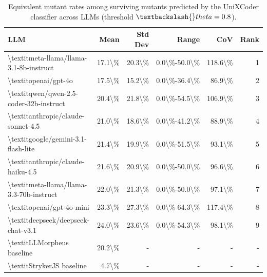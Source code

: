 \begin{table}[htbp]
\centering
{\small
\begin{tabular}{l|rrrrr}
\toprule
\textbf{LLM} & \textbf{Mean} & \textbf{Std Dev} & \textbf{Range} & \textbf{CoV} & \textbf{Rank} \\
\midrule
\textbackslash{}textit{meta-llama/llama-3.1-8b-instruct} & 17.1\textbackslash{}\% & 20.3\textbackslash{}\% & 0.0\textbackslash{}\%-50.0\textbackslash{}\% & 118.6\textbackslash{}\% & 1 \\
\textbackslash{}textit{openai/gpt-4o} & 17.5\textbackslash{}\% & 15.2\textbackslash{}\% & 0.0\textbackslash{}\%-36.4\textbackslash{}\% & 86.9\textbackslash{}\% & 2 \\
\textbackslash{}textit{qwen/qwen-2.5-coder-32b-instruct} & 20.4\textbackslash{}\% & 21.8\textbackslash{}\% & 0.0\textbackslash{}\%-54.5\textbackslash{}\% & 106.9\textbackslash{}\% & 3 \\
\textbackslash{}textit{anthropic/claude-sonnet-4.5} & 21.0\textbackslash{}\% & 18.6\textbackslash{}\% & 0.0\textbackslash{}\%-41.2\textbackslash{}\% & 88.9\textbackslash{}\% & 4 \\
\textbackslash{}textit{google/gemini-3.1-flash-lite} & 21.4\textbackslash{}\% & 19.9\textbackslash{}\% & 0.0\textbackslash{}\%-51.5\textbackslash{}\% & 93.1\textbackslash{}\% & 5 \\
\textbackslash{}textit{anthropic/claude-haiku-4.5} & 21.6\textbackslash{}\% & 20.9\textbackslash{}\% & 0.0\textbackslash{}\%-50.0\textbackslash{}\% & 96.6\textbackslash{}\% & 6 \\
\textbackslash{}textit{meta-llama/llama-3.3-70b-instruct} & 22.0\textbackslash{}\% & 21.3\textbackslash{}\% & 0.0\textbackslash{}\%-50.0\textbackslash{}\% & 97.1\textbackslash{}\% & 7 \\
\textbackslash{}textit{openai/gpt-4o-mini} & 23.3\textbackslash{}\% & 27.3\textbackslash{}\% & 0.0\textbackslash{}\%-64.3\textbackslash{}\% & 117.4\textbackslash{}\% & 8 \\
\textbackslash{}textit{deepseek/deepseek-chat-v3.1} & 24.0\textbackslash{}\% & 23.6\textbackslash{}\% & 0.0\textbackslash{}\%-54.3\textbackslash{}\% & 98.1\textbackslash{}\% & 9 \\
\textbackslash{}textit{LLMorpheus baseline} & 20.2\textbackslash{}\% & - & - & - & - \\
\textbackslash{}textit{StrykerJS baseline} & 4.7\textbackslash{}\% & - & - & - & - \\
\bottomrule
\end{tabular}
}
\caption{Equivalent mutant rates among surviving mutants predicted by the UniXCoder classifier across LLMs (threshold $\textbackslash{}theta=0.8$).}
\label{tab:llm-equiv-main}
\end{table}